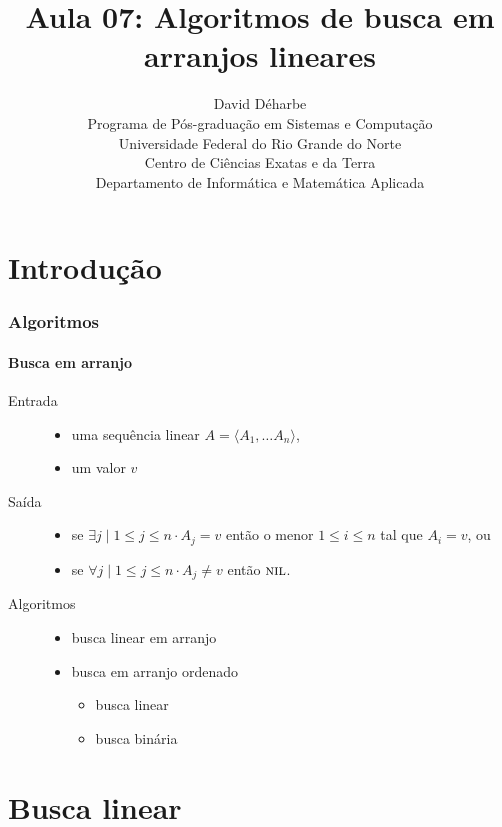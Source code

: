 \documentclass{beamer}
\title{Aula 07: Algoritmos de busca em arranjos lineares}
\author{David Déharbe \\
  Programa de Pós-graduação em Sistemas e Computação \\
  Universidade Federal do Rio Grande do Norte \\
  Centro de Ciências Exatas e da Terra \\
  Departamento de Informática e Matemática Aplicada}
\date{}
\begin{document}
\begin{frame}
  \titlepage
\end{frame}

\section{Introdução}

\begin{frame}

  \frametitle{Algoritmos}
  \framesubtitle{Busca em arranjo}

  \begin{description}
    \item[Entrada]
      \begin{itemize}
        \item uma sequência linear $A = \langle A_1, \dots A_n \rangle$,
        \item um valor $v$
      \end{itemize}
    \item[Saída] 
      \begin{itemize}
        \item se $\exists j \mid 1 \le j \le n \cdot A_j = v$ então o menor $1 \le i \le n$ tal que $A_i = v$, ou
        \item se $\forall j \mid 1 \le j \le n \cdot A_j \neq v$ então $\textnormal{\scshape nil}$.
      \end{itemize}

    \item[Algoritmos]
      \begin{itemize}
      \item busca linear em arranjo 
      \item busca em arranjo ordenado
        \begin{itemize}
        \item busca linear
        \item busca binária
        \end{itemize}
      \end{itemize}

  \end{description}

\end{frame}

\section{Busca linear}
\end{document}
